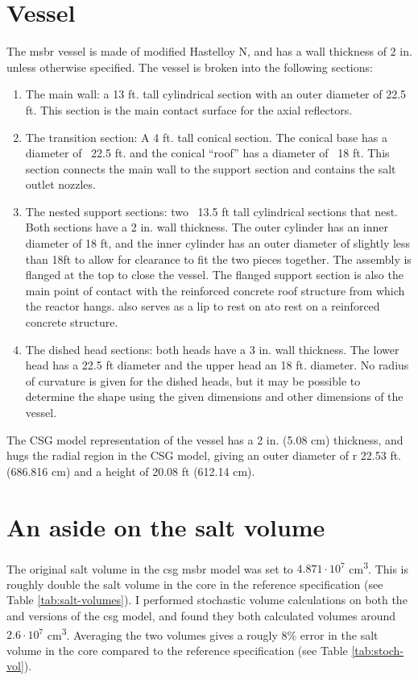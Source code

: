 \section{Vessel}
\label{sec:msbr-vessel}
The \Gls{msbr} vessel is made of modified Hastelloy N, and has a wall thickness
of 2 in. unless otherwise specified\cite{robertson_conceptual_1971}. The vessel
is broken into the following sections:
\begin{enumerate}
    \item The main wall: a 13 ft. tall cylindrical section with an outer
    diameter of 22.5 ft. This section is the main contact surface for the axial
    reflectors.
    \item The transition section: A 4 ft. tall conical section. The conical base
    has a diameter of ~22.5 ft. and the conical ``roof'' has a diameter of ~18
    ft. This section connects the main wall to the support section and contains
    the salt outlet nozzles.
    \item The nested support sections: two ~13.5 ft tall cylindrical sections
    that nest. Both sections have a 2 in. wall thickness. The outer cylinder has
    an inner diameter of 18 ft, and the inner cylinder has an outer diameter of
    slightly less than 18ft to allow for clearance to fit the two pieces
    together. The assembly is flanged at the top to close the vessel. The
    flanged support section is also the main point of contact with the
    reinforced concrete roof structure from which the reactor hangs. also serves
    as a lip to rest on ato rest on a reinforced concrete structure.
    \item The dished head sections: both heads have a 3 in. wall thickness. The
    lower head has a 22.5 ft diameter and the upper head an 18 ft. diameter. No
    radius of curvature is given for the dished heads, but it may be possible to
    determine the shape using the given dimensions and other dimensions of the
    vessel.
\end{enumerate}

The CSG model representation of the vessel has a 2 in. (5.08
\unit{\centi\metre}) thickness, and hugs the radial region in the CSG model,
giving an outer diameter of r 22.53 ft. (686.816 \unit{\centi\metre}) and a
height of 20.08 ft (612.14 \unit{\centi\metre}).

\section{An aside on the salt volume}
\label{sec:salt-volume}
The original salt volume in the \Gls{csg} \Gls{msbr} model was set to
$4.871\cdot 10^7$ \unit{\centi\metre\cubed}. This is roughly double the salt
volume in the core in the reference specification (see Table
\ref{tab:salt-volumes}). I performed stochastic volume calculations on both the
\SerpentTWO and \OpenMC versions of the \Gls{csg} model, and found they both
calculated volumes around $2.6\cdot 10^7$ \unit{\centi\metre\cubed}. Averaging
the two volumes gives a rougly 8\% error in the salt volume in the core compared
to the reference specification (see Table \ref{tab:stoch-vol}).

